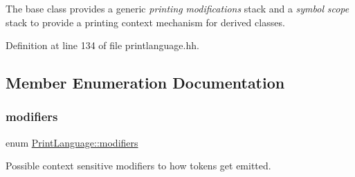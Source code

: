 The base class provides a generic {\itshape printing} {\itshape modifications} stack and a {\itshape symbol} {\itshape scope} stack to provide a printing context mechanism for derived classes. 

Definition at line 134 of file printlanguage.\+hh.



\subsection{Member Enumeration Documentation}
\mbox{\label{class_print_language_a7c9f9ee37d2fcd1f6d48a188c0a82269}} 
\subsubsection{\texorpdfstring{modifiers}{modifiers}}
{\footnotesize\ttfamily enum \mbox{\hyperlink{class_print_language_a7c9f9ee37d2fcd1f6d48a188c0a82269}{Print\+Language\+::modifiers}}}



Possible context sensitive modifiers to how tokens get emitted. 


